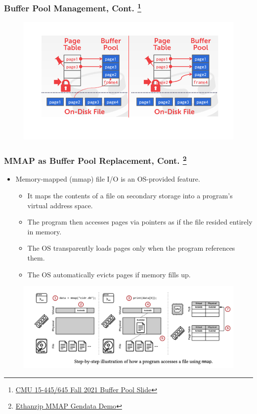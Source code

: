 \documentclass[10pt,svgnames,fragile]{beamer}
\begin{document}
\begin{frame}
	\frametitle{Buffer Pool Management, Cont. \footnote[frame]{\href{https://15445.courses.cs.cmu.edu/fall2021/slides/05-bufferpool.pdf}{CMU 15-445/645 Fall 2021 Buffer Pool Slide}}}
	\begin{center}
		
	\end{center}
	\begin{figure}[h]
		\centering
		\includegraphics[width=0.95\linewidth]{images/buffer1.png}
	\end{figure}
\end{frame}


\begin{frame}
	\frametitle{MMAP as Buffer Pool Replacement, Cont. \footnote[frame]{\href{https://github.com/Ethanzjp/Snippets/tree/master/gendata\_mmap}{Ethanzjp MMAP Gendata Demo}}}
	\begin{itemize}
		\item Memory-mapped (mmap) file I/O is an OS-provided feature.
		\begin{itemize}
			\item<1->[\checkmark] It maps {\color{red}the contents of a file }on secondary storage into a {\color{red}program’s virtual address space}.
			\item<2->[\checkmark] The program then accesses pages via {\color{red}pointers} as if the file resided entirely in memory. 
			\item<3->[\checkmark] The OS {\color{red}transparently loads pages} only when the program references them.
			\item<4->[\checkmark] The OS {\color{red}automatically evicts pages} if memory fills up.
		\end{itemize}
	\end{itemize}
	\pause
	\begin{figure}[h]
		\includegraphics[width=0.75\linewidth]{images/sts.png}
	\end{figure}
\end{frame}
\end{document}
